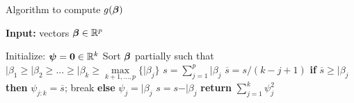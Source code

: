 \begin{algorithm}[tb]
    \caption{Algorithm to compute $g(\bm{\beta})$}
    \label{alg:compute_g_value_algorithm}
    \begin{flushleft}
    \textbf{Input:} vectors $\bm{\beta} \in \mathbb{R}^p$ \\ %
    \end{flushleft}
    \begin{algorithmic}[1]
        \STATE Initialize: $\bm{\psi} = \boldsymbol{0} \in \mathbb{R}^k$
        \STATE Sort $\bm{\beta}$ partially such that \\ \vspace{0.3em}\hspace*{2em}
        $\vert{\beta_1} \geq \vert{\beta_2} \geq ... \geq \vert{\beta_k} \geq \max\limits_{k+1, ..., p} \{ \vert{\beta_j} \}$
        \STATE $s = \sum_{j=1}^p \vert{\beta_j}$
            \STATE $\overline{s} = s / (k - j + 1)$
            \STATE \textbf{if} $\overline{s} \geq \vert{\beta_j}$ \textbf{then} $\psi_{j:k} = \overline{s}$; break \textbf{else} $\psi_j = \vert{\beta_j}$
            \STATE $s = s - \vert{\beta_j}$
        \ENDFOR
        \STATE \textbf{return} $\sum_{j=1}^k \psi_j^2$
    \end{algorithmic}
\end{algorithm}
